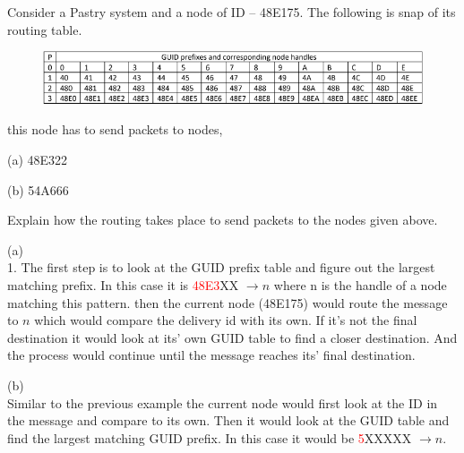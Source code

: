 \documentclass{article}
\begin{document}
\begin{tcolorbox}[colback=blue!5!white,colframe=blue!75!black,title=Question 5]
    Consider a Pastry system and a node of ID – 48E175. The following is snap of its routing table.
    \begin{figure}[H]
        \centering
        \includegraphics[scale=0.70]{q5.png}
    \end{figure}
    this node has to send packets to nodes,
    \begin{itemize}(a) 48E322
    \end{itemize}
    \begin{itemize}(b) 54A666
    \end{itemize}
    Explain how the routing takes place to send packets to the nodes given above.
\tcblower
\begin{itemize}(a) \\
    1. The first step is to look at the GUID prefix table and figure out the largest matching prefix. In this
    case it is \textcolor{red}{48E3}XX $\rightarrow n$ where n is the handle of a node matching this pattern. 
    then the current node (48E175) would route the message to $n$ which would compare the delivery id with its own. If it's not the final
    destination it would look at its' own GUID table to find a closer destination. And the process would continue until the message reaches its' final destination.
\end{itemize}
\begin{itemize}(b) \\
    Similar to the previous example the current node would first look at the ID in the message and compare to its own. Then it would look at the GUID table
and find the largest matching GUID prefix. In this case it would be \textcolor{red}{5}XXXXX $\rightarrow n$.
\end{itemize}
\end{tcolorbox}


\end{document}
